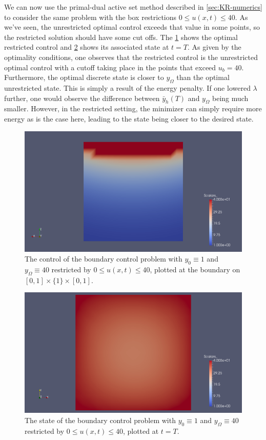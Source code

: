 \documentclass[../thesis.tex]{subfiles}
\begin{document}
We can now use the primal-dual active set method described in \cref{sec:KR-numerics} to consider the same problem with the box restrictions $0 \leq u(x, t) \leq 40$. As we've seen, the unrestricted optimal control exceeds that value in some points, so the restricted solution should have some cut offs.
The \cref{fig:boundary-const-u-rest} shows the optimal restricted control and \cref{fig:boundary-const-y-rest-endtime} shows its associated state at $t = T$.
As given by the optimality conditions, one observes that the restricted control is the unrestricted optimal control with a cutoff taking place in the points that exceed $u_b = 40$.
Furthermore, the optimal discrete state is closer to $y_\Omega$ than the optimal unrestricted state. This is simply a result of the energy penalty. If one lowered $\lambda$ further, one would observe the difference between $\bar{y}_h(T)$ and $y_\Omega$ being much smaller.
However, in the restricted setting, the minimizer can simply require more energy as is the case here, leading to the state being closer to the desired state.
\begin{figure}[htpb]
\centering
\includegraphics[width=\textwidth]{Images/boundary-cont-u-rest.png}
\caption{The control of the boundary control problem with $y_0 \equiv 1$ and $y_\Omega \equiv 40$ restricted by $0 \leq u(x, t) \leq 40$, plotted at the boundary on $[0, 1] \times \{ 1 \} \times [0, 1]$.}
\label{fig:boundary-const-u-rest}
\end{figure}
\begin{figure}[htpb]
\centering
\includegraphics[width=\textwidth]{Images/boundary-cont-y-rest.png}
\caption{The state of the boundary control problem with $y_0 \equiv 1$ and $y_\Omega \equiv 40$ restricted by $0 \leq u(x, t) \leq 40$, plotted at $t = T$.}
\label{fig:boundary-const-y-rest-endtime}
\end{figure}
\end{document}
